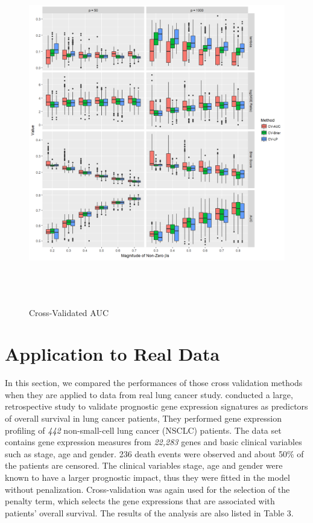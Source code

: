 \begin{figure}[h]
    \centering
		\includegraphics[height= 15cm ]{./figures/figure_auc_extended.png}
    \caption{Cross-Validated AUC}
\end{figure}	

\section{Application to Real Data}

\par In this section, we compared the performances of those cross validation methods when they are applied to data from real lung cancer study. \cite{shedden2008gene} conducted a large, retrospective study to validate prognostic gene expression signatures as predictors of overall survival in lung cancer patients, They performed gene expression profiling of \textit{442} non-small-cell lung cancer (NSCLC) patients. The data set contains gene expression measures from \textit{22,283} genes and basic clinical variables such as stage, age and gender. 236 death events were observed and about 50$\%$ of the patients are censored. The clinical variables stage, age and gender were known to have a larger prognostic impact, thus they were fitted in the model without penalization. Cross-validation was again used for the selection of the penalty term, which selects the gene expressions that are associated with patients' overall survival. The results of the analysis are also listed in Table 3.

